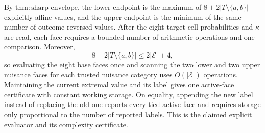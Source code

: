 By \(\mathrm{thm{:}sharp\mbox{-}envelope}\), the lower endpoint is the
maximum of \(8+2|T\setminus\{a,b\}|\) explicitly affine values, and the
upper endpoint is the minimum of the same number of outcome-reversed
values.  After the eight target-cell probabilities and \(\kappa\) are
read, each face requires a bounded number of arithmetic operations and one
comparison.  Moreover,
\[
 8+2|T\setminus\{a,b\}|\le 2|\mathcal E|+4,
\]
so evaluating the eight base faces once and scanning the two lower and two
upper nuisance faces for each trusted nuisance category uses
\(O(|\mathcal E|)\) operations.  Maintaining the current extremal value and
its label gives one active-face certificate with constant working storage.
On equality, appending the new label instead of replacing the old one
reports every tied active face and requires storage only proportional to
the number of reported labels.  This is the claimed explicit evaluator and
its complexity certificate.

